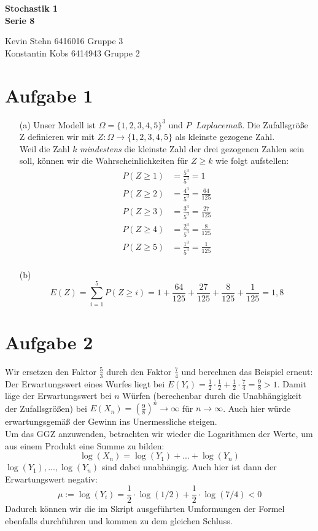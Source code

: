 \documentclass[10pt,a4paper]{article}
\newcommand{\ent}{\mathop{\widehat{=}}}
\begin{document}
\begin{center}
\textbf{Stochastik 1 \\ Serie 8 \\}
\end{center}

\begin{flushright}
Kevin Stehn 6416016 Gruppe 3 \\
Konstantin Kobs 6414943 Gruppe 2
\end{flushright}

\section*{Aufgabe 1}
\begin{itemize}
\item[(a)] Unser Modell ist $\Omega = \{1,2,3,4,5\}^3$ und $P \ent Laplacemaß$. Die Zufallsgröße Z definieren wir mit $Z: \Omega \rightarrow \{1,2,3,4,5\}$ als kleinste gezogene Zahl.\\
Weil die Zahl $k$ \textit{mindestens} die kleinste Zahl der drei gezogenen Zahlen sein soll, können wir die Wahrscheinlichkeiten für $Z \geq k$ wie folgt aufstellen:
\begin{align*}
P(Z \geq 1) &= \frac{5^3}{5^3} = 1\\
P(Z \geq 2) &= \frac{4^3}{5^3} = \frac{64}{125}\\
P(Z \geq 3) &= \frac{3^3}{5^3} = \frac{27}{125}\\
P(Z \geq 4) &= \frac{2^3}{5^3} = \frac{8}{125}\\
P(Z \geq 5) &= \frac{1^3}{5^3} = \frac{1}{125}\\
\end{align*}

\item[(b)] 
$$E(Z) = \sum_{i=1}^5 P(Z \geq i) = 1 + \frac{64}{125} + \frac{27}{125}+ \frac{8}{125} + \frac{1}{125} = 1,8$$
\end{itemize}

\section*{Aufgabe 2}
Wir ersetzen den Faktor $\frac{5}{3}$ durch den Faktor $\frac{7}{4}$ und berechnen das Beispiel erneut:\\
Der Erwartungswert eines Wurfes liegt bei $E(Y_i)=\frac{1}{2} \cdot \frac{1}{2} + \frac{1}{2} \cdot \frac{7}{4} = \frac{9}{8} > 1$. Damit läge der Erwartungswert bei $n$ Würfen (berechenbar durch die Unabhängigkeit der Zufallsgrößen) bei $E(X_n)=\left(\frac{9}{8}\right)^n \rightarrow \infty$ für $n \rightarrow \infty$. Auch hier würde erwartungsgemäß der Gewinn ins Unermessliche steigen.\\
Um das GGZ anzuwenden, betrachten wir wieder die Logarithmen der Werte, um aus einem Produkt eine Summe zu bilden:
$$\log(X_n)=\log(Y_1)+...+\log(Y_n)$$
$\log(Y_1), ..., \log(Y_n)$ sind dabei unabhängig. Auch hier ist dann der Erwartungswert negativ:
$$\mu := \log(Y_i) = \frac{1}{2} \cdot \log(1/2) + \frac{1}{2} \cdot \log(7/4) < 0$$
Dadurch können wir die im Skript ausgeführten Umformungen der Formel ebenfalls durchführen und kommen zu dem gleichen Schluss.
\end{document}
